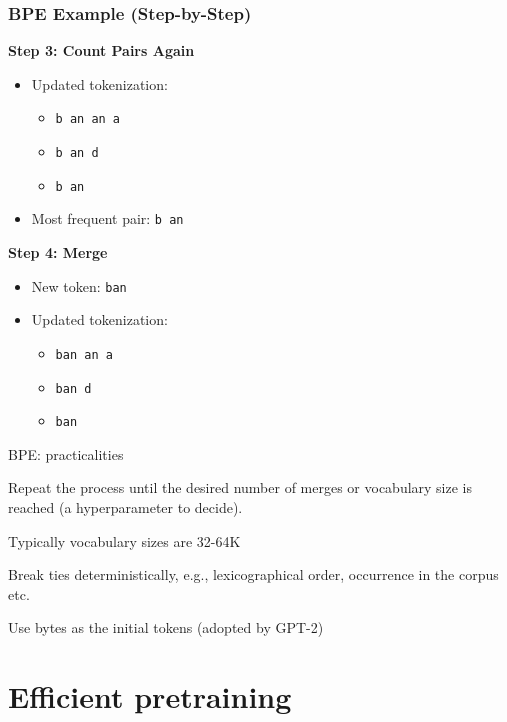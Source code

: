 \documentclass[usenames,dvipsnames,notes,11pt,aspectratio=169,hyperref={colorlinks=true, linkcolor=blue}]{beamer}
\begin{document}
\begin{frame}
\frametitle{BPE Example (Step-by-Step)}

\textbf{Step 3: Count Pairs Again}\\
\begin{itemize}
    \item Updated tokenization:
    \begin{itemize}
        \item \texttt{b an an a}
        \item \texttt{b an d}
        \item \texttt{b an}
    \end{itemize}
    \item Most frequent pair: \texttt{b an}
\end{itemize}

\textbf{Step 4: Merge}\\
\begin{itemize}
    \item New token: \texttt{ban}
    \item Updated tokenization:
    \begin{itemize}
        \item \texttt{ban an a}
        \item \texttt{ban d}
        \item \texttt{ban}
    \end{itemize}
\end{itemize}

\end{frame}

\begin{frame}
    {BPE: practicalities}
    \begin{wideitemize}
        \item Repeat the process until the desired number of merges or vocabulary size is reached (a hyperparameter to decide).
        \item Typically vocabulary sizes are 32-64K
        \item Break ties deterministically, e.g., lexicographical order, occurrence in the corpus etc.
        \item Use bytes as the initial tokens (adopted by GPT-2)
    \end{wideitemize}
\end{frame}

\section{Efficient pretraining}
\end{document}
